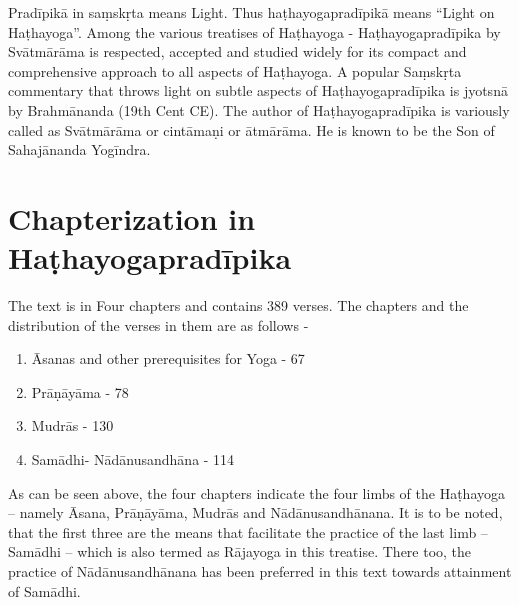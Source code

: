 Pradīpikā in saṃskṛta means Light. Thus haṭhayogapradīpikā means “Light on Haṭhayoga”. Among the various treatises of Haṭhayoga - Haṭhayogapradīpika by Svātmārāma is respected, accepted and studied widely for its compact and comprehensive approach to all aspects of Haṭhayoga. A popular Saṃskṛta commentary that throws light on subtle aspects of Haṭhayogapradīpika is  jyotsnā by Brahmānanda (19th Cent CE).  The author of Haṭhayogapradīpika is variously called as Svātmārāma or cintāmaṇi or ātmārāma. He is known to be the Son of Sahajānanda Yogīndra.

\section*{Chapterization in Haṭhayogapradīpika}

The text is in Four chapters and contains 389 verses. The chapters and the distribution of the verses in them are as follows -  

\begin{enumerate}
\itemsep=0pt
\renewcommand{\theenumi}{\Roman{enumi}}
\renewcommand{\labelenumi}{\theenumi.}
\item Āsanas and other prerequisites for Yoga - 67
\item Prāṇāyāma - 78
\item Mudrās  - 130
\item Samādhi- Nādānusandhāna - 114
\end{enumerate}

As can be seen above, the four chapters indicate the four limbs of the Haṭhayoga – namely Āsana, Prāṇāyāma, Mudrās and Nādānusandhānana. It is to be noted, that the first three are the means that facilitate the practice of the last limb – Samādhi – which is also termed as Rājayoga in this treatise. There too, the practice of Nādānusandhānana has been preferred in this text towards attainment of Samādhi. 

